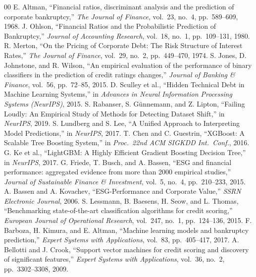 \documentclass[sigconf,anonymous]{acmart}
\begin{document}
\begin{thebibliography}{00}
 E. Altman, ``Financial ratios, discriminant analysis and the prediction of corporate bankruptcy,'' \textit{The Journal of Finance}, vol.~23, no.~4, pp.~589--609, 1968.
 J. Ohlson, ``Financial Ratios and the Probabilistic Prediction of Bankruptcy,'' \textit{Journal of Accounting Research}, vol.~18, no.~1, pp.~109--131, 1980.
 R. Merton, ``On the Pricing of Corporate Debt: The Risk Structure of Interest Rates,'' \textit{The Journal of Finance}, vol.~29, no.~2, pp.~449--470, 1974.
 S. Jones, D. Johnstone, and R. Wilson, ``An empirical evaluation of the performance of binary classifiers in the prediction of credit ratings changes,'' \textit{Journal of Banking \& Finance}, vol.~56, pp.~72--85, 2015.
 D. Sculley et al., ``Hidden Technical Debt in Machine Learning Systems,'' in \textit{Advances in Neural Information Processing Systems (NeurIPS)}, 2015.
 S. Rabanser, S. G\"{u}nnemann, and Z. Lipton, ``Failing Loudly: An Empirical Study of Methods for Detecting Dataset Shift,'' in \textit{NeurIPS}, 2019.
 S. Lundberg and S. Lee, ``A Unified Approach to Interpreting Model Predictions,'' in \textit{NeurIPS}, 2017.
 T. Chen and C. Guestrin, ``XGBoost: A Scalable Tree Boosting System,'' in \textit{Proc.\ 22nd ACM SIGKDD Int.\ Conf.}, 2016.
 G. Ke et al., ``LightGBM: A Highly Efficient Gradient Boosting Decision Tree,'' in \textit{NeurIPS}, 2017.
 G. Friede, T. Busch, and A. Bassen, ``ESG and financial performance: aggregated evidence from more than 2000 empirical studies,'' \textit{Journal of Sustainable Finance \& Investment}, vol.~5, no.~4, pp.~210--233, 2015.
 A. Bassen and A. Kovachev, ``ESG-Performance and Corporate Value,'' \textit{SSRN Electronic Journal}, 2006.
 S. Lessmann, B. Baesens, H. Seow, and L. Thomas, ``Benchmarking state-of-the-art classification algorithms for credit scoring,'' \textit{European Journal of Operational Research}, vol.~247, no.~1, pp.~124--136, 2015.
 F. Barboza, H. Kimura, and E. Altman, ``Machine learning models and bankruptcy prediction,'' \textit{Expert Systems with Applications}, vol.~83, pp.~405--417, 2017.
 A. Bellotti and J. Crook, ``Support vector machines for credit scoring and discovery of significant features,'' \textit{Expert Systems with Applications}, vol.~36, no.~2, pp.~3302--3308, 2009.
\end{thebibliography}
\end{document}
